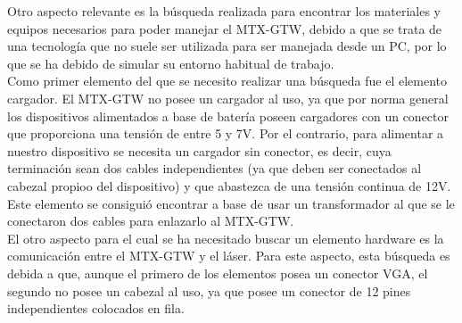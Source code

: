 Otro aspecto relevante es la búsqueda realizada para encontrar los materiales y equipos necesarios para poder manejar el MTX-GTW, debido a que se trata de una tecnología que no suele ser utilizada para ser manejada desde un PC, por lo que se ha debido de simular su entorno habitual de trabajo.\\

Como primer elemento del que se necesito realizar una búsqueda fue el elemento cargador. El MTX-GTW no posee un cargador al uso, ya que por norma general los dispositivos alimentados a base  de batería poseen cargadores con un conector que proporciona una tensión de entre 5 y 7V. Por el contrario, para alimentar a nuestro dispositivo se necesita un cargador sin conector, es decir, cuya terminación sean dos cables independientes (ya que deben ser conectados al cabezal propioo del dispositivo) y que abastezca de una tensión continua de 12V. Este elemento se consiguió encontrar a base de usar un transformador al que se le conectaron dos cables para enlazarlo al MTX-GTW.\\
El otro aspecto para el cual se ha necesitado buscar un elemento hardware es la comunicación entre el MTX-GTW y el láser. Para este aspecto, esta búsqueda es debida a que, aunque el primero de los elementos posea un conector VGA, el segundo no posee un cabezal al uso, ya que posee un conector de 12 pines independientes colocados en fila.